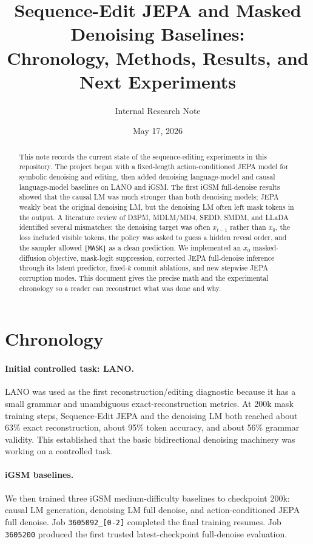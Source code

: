\documentclass[11pt]{article}
\title{Sequence-Edit JEPA and Masked Denoising Baselines:\\Chronology, Methods, Results, and Next Experiments}
\author{Internal Research Note}
\date{May 17, 2026}
\begin{document}
\maketitle

\begin{abstract}
This note records the current state of the sequence-editing experiments in this
repository.  The project began with a fixed-length action-conditioned JEPA model
for symbolic denoising and editing, then added denoising language-model and
causal language-model baselines on LANO and iGSM.  The first iGSM full-denoise
results showed that the causal LM was much stronger than both denoising models;
JEPA weakly beat the original denoising LM, but the denoising LM often left mask
tokens in the output.  A literature review of D3PM, MDLM/MD4, SEDD, SMDM, and
LLaDA identified several mismatches: the denoising target was often $x_{t-1}$
rather than $x_0$, the loss included visible tokens, the policy was asked to
guess a hidden reveal order, and the sampler allowed \texttt{[MASK]} as a clean
prediction.  We implemented an $x_0$ masked-diffusion objective, mask-logit
suppression, corrected JEPA full-denoise inference through its latent predictor,
fixed-$k$ commit ablations, and new stepwise JEPA corruption modes.  This
document gives the precise math and the experimental chronology so a reader can
reconstruct what was done and why.
\end{abstract}

\section{Chronology}

\paragraph{Initial controlled task: LANO.}
LANO was used as the first reconstruction/editing diagnostic because it has a
small grammar and unambiguous exact-reconstruction metrics.  At 200k mask
training steps, Sequence-Edit JEPA and the denoising LM both reached about
63\% exact reconstruction, about 95\% token accuracy, and about 56\% grammar
validity.  This established that the basic bidirectional denoising machinery was
working on a controlled task.

\paragraph{iGSM baselines.}
We then trained three iGSM medium-difficulty baselines to checkpoint 200k:
causal LM generation, denoising LM full denoise, and action-conditioned JEPA
full denoise.  Job \texttt{3605092\_[0-2]} completed the final training
resumes.  Job \texttt{3605200} produced the first trusted latest-checkpoint
full-denoise evaluation.
\end{document}
